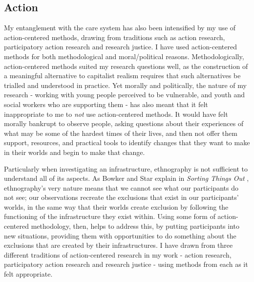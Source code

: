 \subsection{Action}
\label{sec:3-2-2-action}
My entanglement with the care system has also been intensified by my use of action-centered methods, drawing from traditions such as action research, participatory action research and research justice. I have used action-centered methods for both methodological and moral/political reasons. Methodologically, action-centered methods suited my research questions well, as the construction of a meaningful alternative to capitalist realism requires that such alternatives be trialled and understood in practice. Yet morally and politically, the nature of my research - working with young people perceived to be vulnerable, and youth and social workers who are supporting them - has also meant that it felt inappropriate to me to \textit{not} use action-centered methods. It would have felt morally bankrupt to observe people, asking questions about their experiences of what may be some of the hardest times of their lives, and then not offer them support, resources, and practical tools to identify changes that they want to make in their worlds and begin to make that change.

Particularly when investigating an infrastructure, ethnography is not sufficient to understand all of its aspects. As Bowker and Star explain in \textit{Sorting Things Out} \citep{bowker_sorting_1999}, ethnography's very nature means that we cannot see what our participants do not see; our observations recreate the exclusions that exist in our participants' worlds, in the same way that their worlds create exclusion by following the functioning of the infrastructure they exist within. Using some form of action-centered methodology, then, helps to address this, by putting participants into new situations, providing them with opportunities to do something about the exclusions that are created by their infrastructures. I have drawn from three different traditions of action-centered research in my work - action research, participatory action research and research justice - using methods from each as it felt appropriate. 

